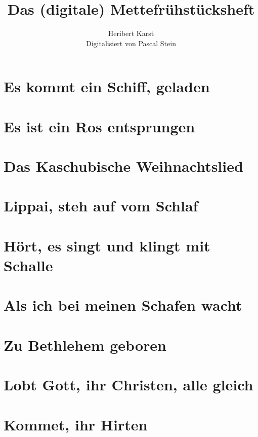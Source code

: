 \documentclass[11pt]{article}
\title{Das (digitale) Mettefrühstücksheft}
\author{
  Heribert Karst
  \\[3ex]
  \small Digitalisiert von Pascal Stein
}
\begin{document}
\maketitle
\newpage
\begin{multicols}{2}
\tableofcontents
\end{multicols}
\pagestyle{empty}
\section{Es kommt ein Schiff, geladen}

\section{Es ist ein Ros entsprungen}

\section{Das Kaschubische Weihnachtslied}

\section{Lippai, steh auf vom Schlaf}

\section{Hört, es singt und klingt mit Schalle}

\section{Als ich bei meinen Schafen wacht}

\section{Zu Bethlehem geboren}

\section{Lobt Gott, ihr Christen, alle gleich}

\section{Kommet, ihr Hirten}
\end{document}
